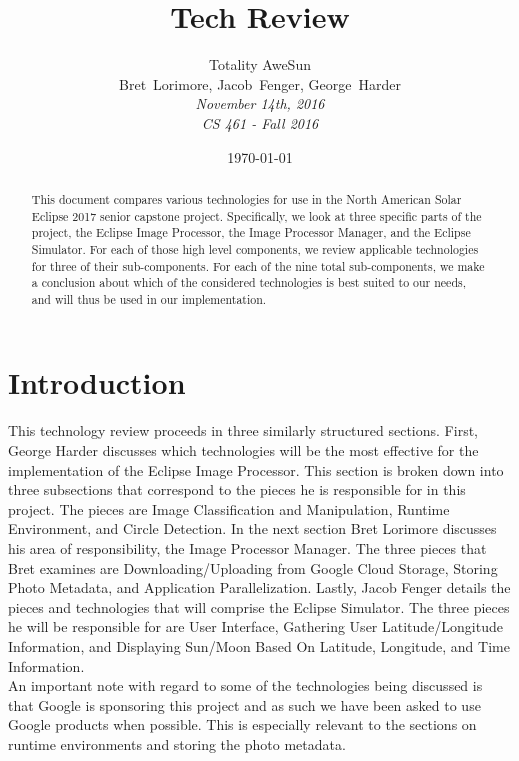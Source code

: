 \documentclass[10pt, onecolumn, draftclsnofoot, letterpaper, compsoc]{IEEEtran}
\title{Tech Review}
\date{\today} %
\author{Totality AweSun \\
		Bret~Lorimore, Jacob~Fenger, George~Harder \\
		\textit{November 14th, 2016 \\
		CS 461 - Fall 2016}}
\begin{document}
\maketitle

\begin{abstract}

This document compares various technologies for use in the North American Solar
Eclipse 2017 senior capstone project. Specifically, we look at three specific parts
of the project, the Eclipse Image Processor, the Image Processor Manager, and the
Eclipse Simulator. For each of those high level components, we review applicable
technologies for three of their sub-components. For each of the nine total sub-components,
we make a conclusion about which of the considered technologies is best suited to our
needs, and will thus be used in our implementation.

\end{abstract}

\newpage

\section{Introduction}

This technology review proceeds in three similarly structured sections. First,
George Harder discusses which technologies will be the most effective for the
implementation of the Eclipse Image Processor. This section is broken down into
three subsections that correspond to the pieces he is responsible for in this
project. The pieces are Image Classification and Manipulation, Runtime
Environment, and Circle Detection. In the next section Bret Lorimore discusses
his area of responsibility, the Image Processor Manager. The three pieces that
Bret examines are Downloading/Uploading from Google Cloud Storage, Storing
Photo Metadata, and Application Parallelization. Lastly, Jacob Fenger details
the pieces and technologies that will comprise the Eclipse Simulator. The three
pieces he will be responsible for are User Interface, Gathering User
Latitude/Longitude Information, and Displaying Sun/Moon Based On Latitude,
Longitude, and Time Information. \\

An important note with regard to some of the technologies being discussed is
that Google is sponsoring this project and as such we have been asked to use
Google products when possible. This is especially relevant to the sections on
runtime environments and storing the photo metadata. \\
\end{document}
